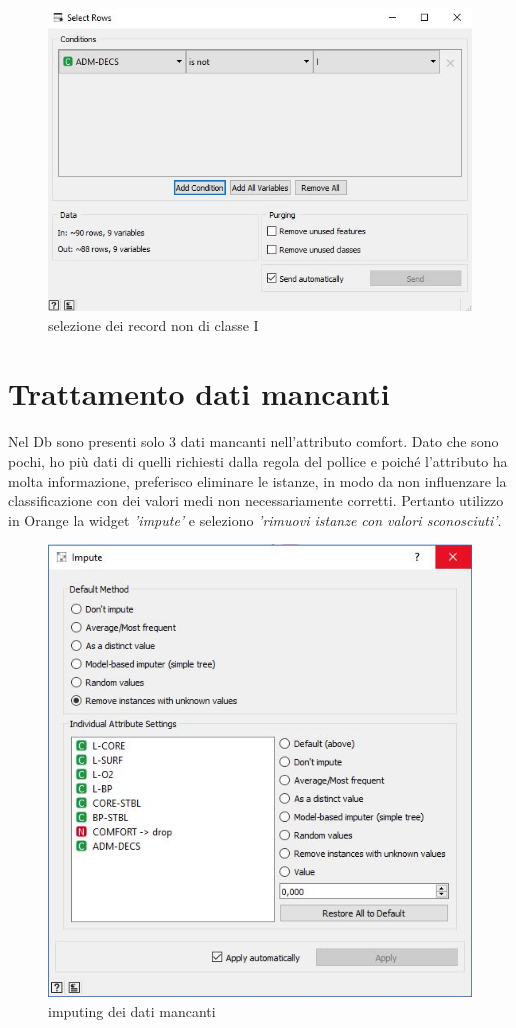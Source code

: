 \documentclass[a4paper, 12p]{report}
\begin{document}
\begin{figure}
	\centering
	\includegraphics[scale = 0.5]{img/rows.JPG}
	\caption{selezione dei record non di classe I}	\label{fig:2}
\end{figure}	
\section{Trattamento dati mancanti}
Nel Db sono presenti solo 3 dati mancanti nell'attributo comfort. Dato che sono pochi, ho più dati di quelli richiesti dalla regola del pollice e poiché l'attributo ha molta informazione, preferisco eliminare le istanze, in modo da non influenzare la classificazione con dei valori medi non necessariamente corretti.
Pertanto utilizzo in Orange la widget \emph{'impute'} e seleziono \emph{'rimuovi istanze con valori sconosciuti'}.
\begin{figure}	
	\centering
	\includegraphics[scale = 0.4]{img/imputing.JPG}
	\caption{imputing dei dati mancanti }\label{fig:3}
\end{figure}
\end{document}
